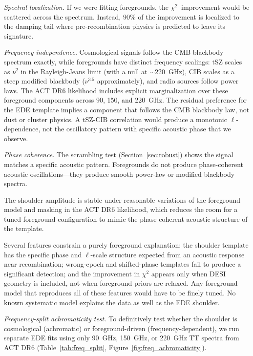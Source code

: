 \documentclass[onecolumn,showpacs,preprintnumbers,amsmath,amssymb,prd]{revtex4-2}
\newcommand{\chisq}{$\chi^2$}
\begin{document}
\emph{Spectral localization.} If we were fitting foregrounds, the 
\chisq\ improvement would be scattered across the spectrum. Instead, 
90\% of the improvement is localized to the damping tail where 
pre-recombination physics is predicted to leave its signature.

\emph{Frequency independence.} Cosmological signals follow the CMB blackbody 
spectrum exactly, while foregrounds have distinct frequency scalings: tSZ 
scales as $\nu^2$ in the Rayleigh-Jeans limit (with a null at $\sim$220~GHz), 
CIB scales as a steep modified blackbody ($\nu^{3.5}$ approximately), and 
radio sources follow power laws. The ACT DR6 likelihood includes explicit 
marginalization over these foreground components across 90, 150, and 220~GHz. 
The residual preference for the EDE template implies a component that follows 
the CMB blackbody law, not dust or cluster physics. A tSZ-CIB correlation 
would produce a monotonic $\ell$-dependence, not the oscillatory pattern 
with specific acoustic phase that we observe.

\emph{Phase coherence.} The scrambling test 
(Section~\ref{sec:robust}) shows the signal matches a specific acoustic 
pattern. Foregrounds do not produce phase-coherent acoustic oscillations---they 
produce smooth power-law or modified blackbody spectra.

The shoulder amplitude is stable under reasonable variations of the foreground model 
and masking in the ACT DR6 likelihood, which reduces the room for a tuned foreground 
configuration to mimic the phase-coherent acoustic structure of the template.

Several features constrain a purely foreground 
explanation: the shoulder template has the specific phase and $\ell$-scale structure 
expected from an acoustic response near recombination; wrong-epoch and shifted-phase 
templates fail to produce a significant detection; and the improvement in $\chi^2$ 
appears only when DESI geometry is included, not when foreground priors are relaxed. 
Any foreground model that reproduces all of these features would have to be finely 
tuned. No known systematic model explains the data as well as the EDE shoulder.

\emph{Frequency-split achromaticity test.} To definitively test whether the shoulder
is cosmological (achromatic) or foreground-driven (frequency-dependent), we run 
separate EDE fits using only 90~GHz, 150~GHz, or 220~GHz TT spectra from ACT DR6
(Table~\ref{tab:freq_split}, Figure~\ref{fig:freq_achromaticity}).
\end{document}
